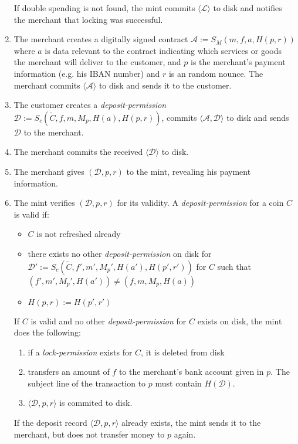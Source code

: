 \documentclass{llncs}
\begin{document}
\begin{enumerate}
  If double spending is not found, the mint commits $\langle \mathcal{L} \rangle$ to disk
  and notifies the merchant that locking was successful.
\item\label{contract} The merchant creates a digitally signed contract
  $\mathcal{A} := S_M(m, f, a, H(p, r))$ where $a$ is data relevant to the contract
  indicating which services or goods the merchant will deliver to the customer, and $p$ is the
  merchant's payment information (e.g. his IBAN number) and $r$ is an random nounce.
  The merchant commits $\langle \mathcal{A} \rangle$ to disk and sends it to the customer.
\item The customer creates a
  \emph{deposit-permission} $\mathcal{D} := S_c(\widetilde{C}, f, m, M_p, H(a), H(p, r))$, commits
  $\langle \mathcal{A}, \mathcal{D} \rangle$ to disk and sends $\mathcal{D}$ to the merchant.
\item\label{invoice_paid} The merchant commits the received $\langle \mathcal{D} \rangle$ to disk.
\item The merchant gives $(\mathcal{D}, p, r)$ to the mint, revealing his
  payment information.
\item The mint verifies $(\mathcal{D}, p, r)$ for its validity.  A
  \emph{deposit-permission} for a coin $C$ is valid if:
  \begin{itemize}
  \item $C$ is not refreshed already
  \item there exists no other \emph{deposit-permission} on disk for \\
    $\mathcal{D'} := S_c(\widetilde{C}, f', m', M_p', H(a'), H(p', r'))$ for $C$
    such that \\ $(f', m',M_p', H(a')) \neq (f, m, M_p, H(a))$
  \item  $H(p, r) := H(p', r')$
  \end{itemize}
  If $C$ is valid and no other \emph{deposit-permission} for $C$ exists on disk, the
  mint does the following:
  \begin{enumerate}
    \item if a \emph{lock-permission} exists for $C$, it is deleted from disk
    \item\label{transfer} transfers an amount of $f$ to the merchant's bank account
      given in $p$.  The subject line of the transaction to $p$ must contain
      $H(\mathcal{D})$.
    \item $\langle \mathcal{D}, p, r \rangle$ is commited to disk.
  \end{enumerate}
  If the deposit record $\langle \mathcal{D}, p, r \rangle$ already exists,
  the mint sends it to the merchant, but does not transfer money to $p$ again.
\end{enumerate}
\end{document}
